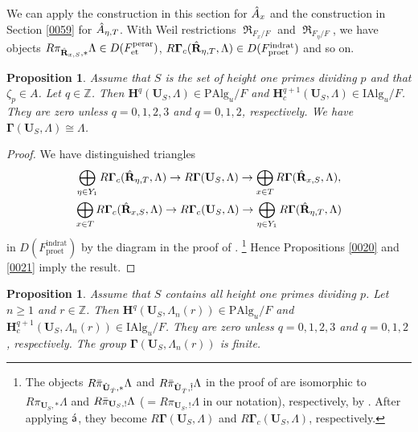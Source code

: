 \documentclass{amsart}
\newtheorem{Prop}[Thm]{Proposition}
\theoremstyle{remark}
\numberwithin{equation}{section}
\newcommand{\Z}{\mathbb{Z}}
\newcommand{\et}{\mathrm{et}}
\newcommand{\rat}{\mathrm{rat}}
\newcommand{\ind}{\mathrm{ind}}
\newcommand{\pro}{\mathrm{pro}}
\newcommand{\perar}{\mathrm{perar}}
\newcommand{\Alg}{\mathrm{Alg}}
\newcommand{\Ind}{\mathrm{I}}
\newcommand{\Pro}{\mathrm{P}}
\newcommand{\alg}[1]{\mathbf{#1}}
\newcommand{\algebrize}{\Acute{\mathsf{a}}}
\DeclareMathOperator{\Weil}{\mathfrak{R}}
\begin{document}
We can apply the construction in this section for $\Hat{A}_{x}$
and the construction in Section \ref{0059} for $\Hat{A}_{\eta, T}$.
With Weil restrictions $\Weil_{F_{x} / F}$ and $\Weil_{F_{\eta} / F}$,
we have objects
$R \pi_{\Hat{\alg{R}}_{x, S}, \ast} \Lambda \in D(F^{\perar}_{\et})$,
$R \alg{\Gamma}_{c}(\Hat{\alg{R}}_{\eta, T}, \Lambda) \in D(F^{\ind\rat}_{\pro\et})$
and so on.



\begin{Prop} \label{0022}
	Assume that $S$ is the set of height one primes dividing $p$
	and that $\zeta_{p} \in A$.
	Let $q \in \Z$.
	Then $\alg{H}^{q}(\alg{U}_{S}, \Lambda) \in \Pro \Alg_{u} / F$
	and $\alg{H}^{q + 1}_{c}(\alg{U}_{S}, \Lambda) \in \Ind \Alg_{u} / F$.
	They are zero unless $q = 0, 1, 2, 3$ and $q = 0, 1, 2$, respectively.
	We have $\alg{\Gamma}(\alg{U}_{S}, \Lambda) \cong \Lambda$.
\end{Prop}

\begin{proof}
	We have distinguished triangles
		\begin{gather*}
					\bigoplus_{\eta \in Y_{1}}
						R \alg{\Gamma}_{c}(\Hat{\alg{R}}_{\eta, T}, \Lambda)
				\to
					R \alg{\Gamma}(\alg{U}_{S}, \Lambda)
				\to
					\bigoplus_{x \in T}
						R \alg{\Gamma}(\Hat{\alg{R}}_{x, S}, \Lambda),
			\\
					\bigoplus_{x \in T}
						R \alg{\Gamma}_{c}(\Hat{\alg{R}}_{x, S}, \Lambda)
				\to
					R \alg{\Gamma}_{c}(\alg{U}_{S}, \Lambda)
				\to
					\bigoplus_{\eta \in Y_{1}}
						R \alg{\Gamma}(\Hat{\alg{R}}_{\eta, T}, \Lambda)
		\end{gather*}
	in $D(F^{\ind\rat}_{\pro\et})$
	by the diagram in the proof of \cite[Proposition 10.5.5]{Suz24}.%
	\footnote{
		The objects
		$R \Bar{\pi}_{\Hat{\alg{U}}_{\Hat{T}}, \ast} \Lambda$ and
		$R \Bar{\pi}_{\Hat{\alg{U}}_{\Hat{T}}, \Hat{!}} \Lambda$
		in the proof of \cite[Proposition 10.5.5]{Suz24}
		are isomorphic to
		$R \pi_{\alg{U}_{S}, \ast} \Lambda$ and
		$R \Bar{\pi}_{\alg{U}_{S}, !} \Lambda$
		($= R \pi_{\alg{U}_{S}, !} \Lambda$ in our notation),
		respectively,
		by \cite[Propositions 10.4.1 and 10.5.1]{Suz24}.
		After applying $\algebrize$,
		they become $R \alg{\Gamma}(\alg{U}_{S}, \Lambda)$
		and $R \alg{\Gamma}_{c}(\alg{U}_{S}, \Lambda)$, respectively.
	}
	Hence Propositions \ref{0020} and \ref{0021} imply the result.
\end{proof}

\begin{Prop} \label{0040}
	Assume that $S$ contains all height one primes dividing $p$.
	Let $n \ge 1$ and $r \in \Z$.
	Then $\alg{H}^{q}(\alg{U}_{S}, \Lambda_{n}(r)) \in \Pro \Alg_{u} / F$
	and $\alg{H}^{q + 1}_{c}(\alg{U}_{S}, \Lambda_{n}(r)) \in \Ind \Alg_{u} / F$.
	They are zero unless $q = 0, 1, 2, 3$ and $q = 0, 1, 2$, respectively.
	The group $\alg{\Gamma}(\alg{U}_{S}, \Lambda_{n}(r))$ is finite.
\end{Prop}
\end{document}

